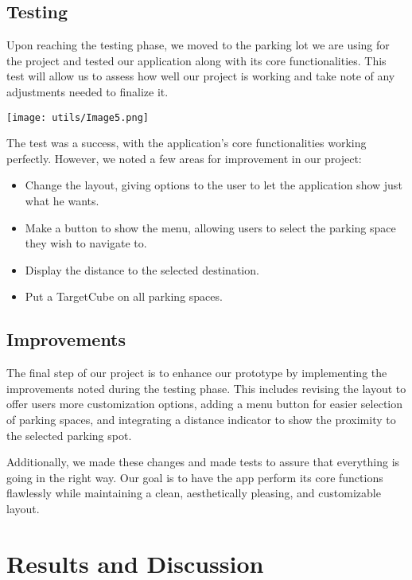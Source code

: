 \documentclass[11pt]{article}
\begin{document}
\begin{multicols}{2}
    \subsection{Testing}
    
    Upon reaching the testing phase, we moved to the parking lot we are using for the project and tested our application along with its core functionalities. This test will allow us to assess how well our project is working and take note of any adjustments needed to finalize it.

    \vspace{0,5cm}
    {
	    \centering
	    \texttt{[image: utils/Image5.png]}
    }
    \vspace{0,5cm}
    
    The test was a success, with the application's core functionalities working perfectly. However, we noted a few areas for improvement in our project:
    \begin{itemize}
		\item Change the layout, giving options to the user to let the application show just what he wants.
		\item Make a button to show the menu, allowing users to select the parking space they wish to navigate to.
		\item Display the distance to the selected destination.
		\item Put a TargetCube on all parking spaces.
    \end{itemize}

    \subsection{Improvements}

    The final step of our project is to enhance our prototype by implementing the improvements noted during the testing phase. This includes revising the layout to offer users more customization options, adding a menu button for easier selection of parking spaces, and integrating a distance indicator to show the proximity to the selected parking spot.

    Additionally, we made these changes and made tests to assure that everything is going in the right way. Our goal is to have the app perform its core functions flawlessly while maintaining a clean, aesthetically pleasing, and customizable layout.

    \section{Results and Discussion}



\end{multicols}
\end{document}

